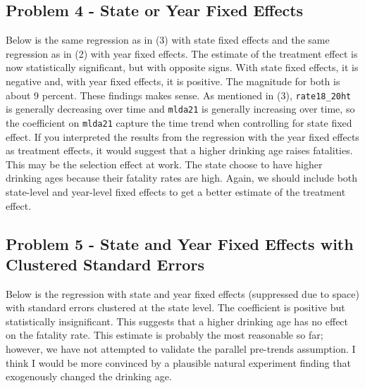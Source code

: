 \documentclass{article}
\begin{document}
\pagebreak

\subsection*{Problem 4 - State or Year Fixed Effects}

Below is the same regression as in (3) with state fixed effects and the same regression as in (2) with year fixed effects.  The estimate of the treatment effect is now statistically significant, but with opposite signs.  With state fixed effects, it is negative and, with year fixed effects, it is positive.  The magnitude for both is about 9 percent. These findings makes sense. As mentioned in (3), \texttt{rate18\_20ht} is generally decreasing over time and \texttt{mlda21} is generally increasing over time, so the coefficient on \texttt{mlda21} capture the time trend when controlling for state fixed effect.  If you interpreted the results from the regression with the year fixed effects as treatment effects, it would suggest that a higher drinking age raises fatalities.  This may be the selection effect at work.  The state choose to have higher drinking ages because their fatality rates are high. Again, we should include both state-level and year-level fixed effects to get a better estimate of the treatment effect.

\scriptsize

\begin{center}

\end{center}

\begin{center}

\end{center}

\normalsize

\pagebreak

\subsection*{Problem 5 - State and Year Fixed Effects with Clustered Standard Errors}

Below is the regression with state and year fixed effects (suppressed due to space) with standard errors clustered at the state level.  The coefficient is positive but statistically insignificant.  This suggests that a higher drinking age has no effect on the fatality rate.  This estimate is probably the most reasonable so far; however, we have not attempted to validate the parallel pre-trends assumption. I think I would be more convinced by a plausible natural experiment finding that exogenously changed the drinking age. 
\end{document}
